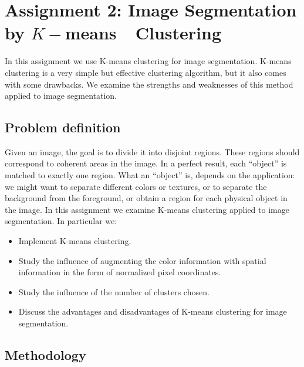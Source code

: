 \section{Assignment 2: Image Segmentation by $K-$means\ \ Clustering}
\label{sec:assignment2}

In this assignment we use K-means clustering for image segmentation. K-means clustering is a very simple but effective clustering algorithm, but it also comes with some drawbacks. We examine the strengths and weaknesses of this method applied to image segmentation.

\subsection{Problem definition}

Given an image, the goal is to divide it into disjoint regions. These regions should correspond to coherent areas in the image. In  a perfect result, each ``object'' is matched to exactly one region. What an ``object'' is, depends on the application: we might want to separate different colors or textures, or to separate the background from the foreground, or obtain a region for each physical object in the image. In this assignment we examine K-means clustering applied to image segmentation.
 In particular we:
\begin{itemize}[noitemsep]
	\item Implement K-means clustering.
	\item Study the influence of augmenting the color information with spatial information in the form of normalized pixel coordinates.
	\item Study the influence of the number of clusters chosen.
	\item Discuss the advantages and disadvantages of K-means clustering for image segmentation.
\end{itemize}

\subsection{Methodology}

